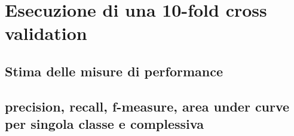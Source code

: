\section{Esecuzione di una 10-fold cross validation}
\subsection{Stima delle misure di performance}

\subsection{precision, recall, f-measure, area under curve per singola classe e 
complessiva}